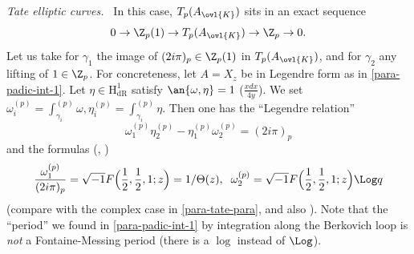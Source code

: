 \begin{para}{\itshape Tate elliptic curves.\ }
In this case, $T_p(A_{\ovl{K}})$ sits in an exact sequence 
\begin{equation*}
 0\rightarrow {\Z}_p(1)\rightarrow T_p(A_{\ovl{K}}) \rightarrow
  {\Z}_p \rightarrow 0.
\end{equation*}
Let us take for $\gamma_1$ the image of $(2i\pi)_p \in {\Z}_p(1)$ in
$T_p(A_{\ovl{K}})$, and for $\gamma_2$ any lifting of $1 \in {\Z}_p$.
For concreteness, let $A=X_z$ be in Legendre form as in
\ref{para-padic-int-1}.  Let $\eta \in \mathrm{H}^1_{\mathrm{dR}}$
satisfy $\an{\omega,\eta}=1$ (\eg $\frac{xdx}{4y}$).  We set
$\omega^{(p)}_i=\int^{(p)}_{\gamma_i}\omega,
\eta^{(p)}_i=\int^{(p)}_{\gamma_i}\eta$.  Then one has the ``Legendre
relation''
\begin{equation*}
\omega^{(p)}_1\eta^{(p)}_2-\eta^{(p)}_1\omega^{(p)}_2=(2i\pi)_p
\end{equation*}
and the formulas (\cf \cite{pbl}, \cite{get})
\begin{equation*}
\frac{\omega^{(p)}_1}{(2i\pi)_p} = \sqrt{-1}F\Bigl(\frac{1}{2},
\frac{1}{2},1;z\Bigr) = 1/\Theta(z), \;\; \omega^{(p)}_2 =
\sqrt{-1}F\Bigl(\frac{1}{2},\frac{1}{2},1;z\Bigr) \Log q
\end{equation*}
(compare with the complex case in \ref{para-tate-para}, and also
\cite[p.406]{f2}).  Note that the ``period'' we found in
\ref{para-padic-int-1} by integration along the Berkovich loop is
 \emph{not} a Fontaine-Messing period (there is a $\log$ instead of
 $\Log$).
\end{para}

